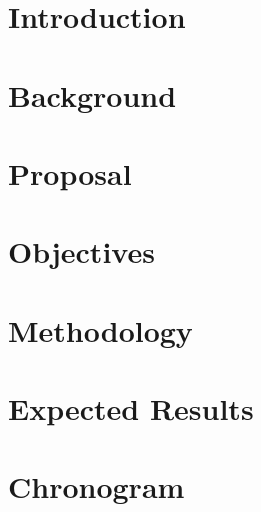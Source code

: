 \documentclass[mestrado]{pacotes/unb-cic}
\begin{document}
\begin{abstract}


\end{abstract}

\tableofcontents
\listoffigures

\textual

\chapter{Introduction}

%
%


\chapter{Background}

%
%
%

%


\chapter{Proposal}



\chapter{Objectives}

\chapter{Methodology}

\chapter{Expected Results}

\chapter{Chronogram}


\postextual
\anexos




\end{document}
